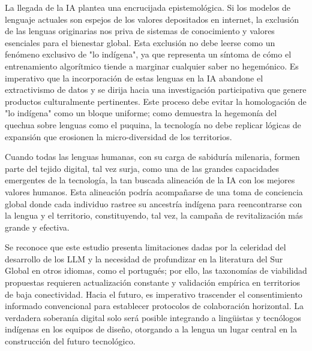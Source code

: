 \documentclass[spanish]{textolivre}
\begin{document}
La llegada de la IA plantea una encrucijada epistemológica. Si los modelos de lenguaje actuales son espejos de los valores depositados en internet, la exclusión de las lenguas originarias nos priva de sistemas de conocimiento y valores esenciales para el bienestar global. Esta exclusión no debe leerse como un fenómeno exclusivo de "lo indígena", ya que representa un síntoma de cómo el entrenamiento algorítmico tiende a marginar cualquier saber no hegemónico. Es imperativo que la incorporación de estas lenguas en la IA abandone el extractivismo de datos y se dirija hacia una investigación participativa que genere productos culturalmente pertinentes. Este proceso debe evitar la homologación de "lo indígena" como un bloque uniforme; como demuestra la hegemonía del quechua sobre lenguas como el puquina, la tecnología no debe replicar lógicas de expansión que erosionen la micro-diversidad de los territorios.

Cuando todas las lenguas humanas, con su carga de sabiduría milenaria, formen parte del tejido digital, tal vez surja, como una de las grandes capacidades emergentes de la tecnología, la tan buscada alineación de la IA con los mejores valores humanos. Esta alineación podría acompañarse de una toma de conciencia global donde cada individuo rastree su ancestría indígena para reencontrarse con la lengua y el territorio, constituyendo, tal vez, la campaña de revitalización más grande y efectiva.

Se reconoce que este estudio presenta limitaciones dadas por la celeridad del desarrollo de los LLM y la necesidad de profundizar en la literatura del Sur Global en otros idiomas, como el portugués; por ello, las taxonomías de viabilidad propuestas requieren actualización constante y validación empírica en territorios de baja conectividad. Hacia el futuro, es imperativo trascender el consentimiento informado convencional para establecer protocolos de colaboración horizontal. La verdadera soberanía digital solo será posible integrando a lingüistas y tecnólogos indígenas en los equipos de diseño, otorgando a la lengua un lugar central en la construcción del futuro tecnológico.





\printbibliography\label{sec-bib}
\end{document}

